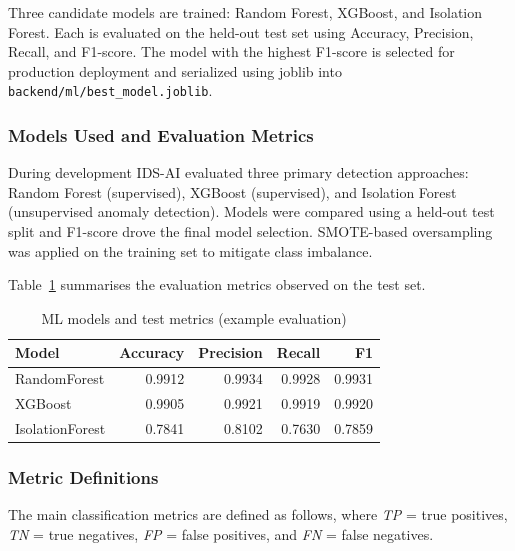 \documentclass[12pt,a4paper]{report}
\begin{document}
Three candidate models are trained: Random Forest, XGBoost, and Isolation
Forest. Each is evaluated on the held-out test set using Accuracy, Precision,
Recall, and F1-score. The model with the highest F1-score is selected for
production deployment and serialized using joblib into
\texttt{backend/ml/best\_model.joblib}.

\subsubsection{Models Used and Evaluation Metrics}

During development IDS-AI evaluated three primary detection approaches:
Random Forest (supervised), XGBoost (supervised), and Isolation Forest
(unsupervised anomaly detection). Models were compared using a held-out test
split and F1-score drove the final model selection. SMOTE-based oversampling
was applied on the training set to mitigate class imbalance.

Table~\ref{tab:ml-metrics} summarises the evaluation metrics observed on the
test set.

\begin{table}[htbp]
  \centering
  \caption{ML models and test metrics (example evaluation)}
  \label{tab:ml-metrics}
  \begin{tabular}{lrrrr}
    \toprule
    \textbf{Model} & \textbf{Accuracy} & \textbf{Precision} & \textbf{Recall} & \textbf{F1} \\
    \midrule
    RandomForest    & 0.9912 & 0.9934 & 0.9928 & 0.9931 \\
    XGBoost         & 0.9905 & 0.9921 & 0.9919 & 0.9920 \\
    IsolationForest & 0.7841 & 0.8102 & 0.7630 & 0.7859 \\
    \bottomrule
  \end{tabular}
\end{table}

\subsubsection{Metric Definitions}

The main classification metrics are defined as follows, where
\textit{TP} = true positives, \textit{TN} = true negatives,
\textit{FP} = false positives, and \textit{FN} = false negatives.
\end{document}
